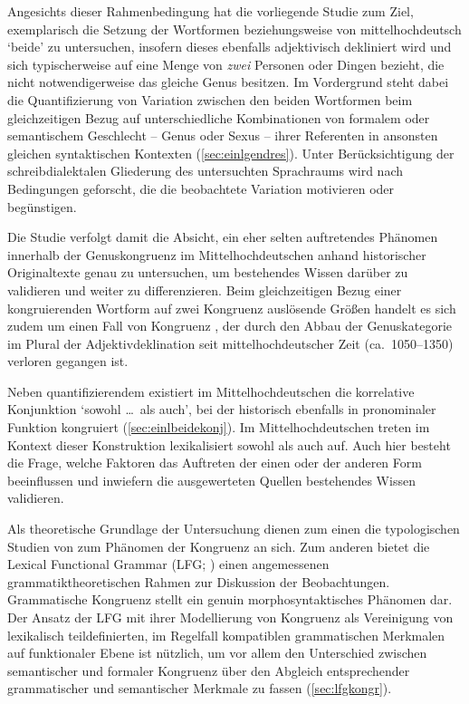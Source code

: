 Angesichts dieser Rahmenbedingung hat die vorliegende Studie zum Ziel,
exemplarisch die Setzung der Wortformen  beziehungsweise
 von mittelhochdeutsch  `beide' zu untersuchen,
insofern dieses ebenfalls adjektivisch dekliniert wird und sich typischerweise
auf eine Menge von \emph{zwei} Personen oder Dingen bezieht, die nicht
notwendigerweise das gleiche Genus besitzen. Im Vordergrund steht dabei die
Quantifizierung von Variation zwischen den beiden Wortformen beim
gleichzeitigen Bezug auf unterschiedliche Kombinationen von formalem oder
semantischem Geschlecht -- Genus oder Sexus -- ihrer Referenten in ansonsten
gleichen syntaktischen Kontexten (\cref{sec:einlgendres}). Unter
Berücksichtigung der schreibdialektalen Gliederung des untersuchten Sprachraums
wird nach Bedingungen geforscht, die die beobachtete Variation motivieren oder
begünstigen.

Die Studie verfolgt damit die Absicht, ein eher selten auftretendes Phänomen
innerhalb der Genuskongruenz im Mittelhochdeutschen anhand historischer
Originaltexte genau zu untersuchen, um bestehendes Wissen darüber zu validieren
und weiter zu differenzieren. Beim gleichzeitigen Bezug einer kongruierenden
Wortform auf zwei Kongruenz auslösende Größen handelt es sich zudem um einen
 Fall von Kongruenz \autocite[8--27, 59--60]{corbett2006},
der durch den Abbau der Genuskategorie im Plural der Adjektivdeklination seit
mittelhochdeutscher Zeit (ca.\ 1050--1350) verloren gegangen ist.

Neben quantifizierendem  existiert im Mittelhochdeutschen die
korrelative Konjunktion 
`sowohl \dots\ als auch', bei der  historisch ebenfalls in
pronominaler Funktion kongruiert (\cref{sec:einlbeidekonj}). Im
Mittelhochdeutschen treten im Kontext dieser Konstruktion lexikalisiert sowohl
 als auch  auf. Auch hier besteht die Frage, welche
Faktoren das Auftreten der einen oder der anderen Form beeinflussen und
inwiefern die ausgewerteten Quellen bestehendes Wissen validieren.

Als theoretische Grundlage der Untersuchung dienen zum einen die typologischen
Studien von \citet{corbett1979,corbett1983,corbett1991,corbett2006} zum
Phänomen der Kongruenz an sich. Zum anderen bietet die Lexical Functional
Grammar (LFG; \cites{kaplanbresnan1982}{bresnan2001}{bresnanetal2016}) einen
angemessenen grammatiktheoretischen Rahmen zur Diskussion der Beobachtungen.
Grammatische Kongruenz stellt ein genuin morphosyntaktisches Phänomen dar. Der
Ansatz der LFG mit ihrer Modellierung von Kongruenz als Vereinigung von
lexikalisch teildefinierten, im Regelfall kompatiblen grammatischen Merkmalen
auf funktionaler Ebene ist nützlich, um vor allem den Unterschied zwischen
semantischer und formaler Kongruenz über den Abgleich entsprechender
grammatischer und semantischer Merkmale zu fassen (\cref{sec:lfgkongr}).

